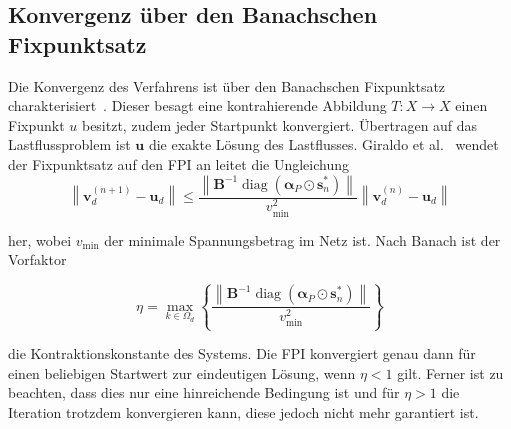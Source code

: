 \subsection{Konvergenz über den Banachschen Fixpunktsatz}
\label{subsec:banach}


Die Konvergenz des Verfahrens ist über den Banachschen Fixpunktsatz charakterisiert~\cite{Banach.1922}. Dieser besagt eine kontrahierende Abbildung $T: X \to X$ einen Fixpunkt $u$ besitzt, zudem jeder Startpunkt konvergiert.
Übertragen auf das Lastflussproblem ist $\mathbf{u}$ die exakte Lösung des Lastflusses. Giraldo et al.~\cite{Giraldo2022} wendet der Fixpunktsatz auf den FPI an leitet die Ungleichung
\begin{equation}
	\label{eq:contraction_tpf}
	\left\|\mathbf{v}_d^{(n+1)} - \mathbf{u}_d\right\|
	\leq \frac{\left\|\mathbf{B}^{-1}\operatorname{diag}(\boldsymbol{\alpha}_P \odot \mathbf{s}_n^{*})\right\|}{v_{\min}^2}
	\left\|\mathbf{v}_d^{(n)} - \mathbf{u}_d\right\|
\end{equation}

her, wobei $v_{\min}$  der minimale Spannungsbetrag im Netz ist. Nach Banach ist der Vorfaktor 

\begin{equation}
	\label{eq:eta}
	\boxed{\;\eta = \max_{k \in \Omega_d}\left\{\frac{\left\|\mathbf{B}^{-1}\operatorname{diag}(\boldsymbol{\alpha}_P \odot \mathbf{s}_n^{*})\right\|}{v_{\min}^2}\right\}\;}
\end{equation}

die Kontraktionskonstante des Systems.
Die FPI konvergiert genau dann für einen beliebigen Startwert zur eindeutigen Lösung, wenn $\eta < 1$ gilt. 
Ferner ist zu beachten, dass dies nur eine hinreichende Bedingung ist und für  $\eta > 1$ die Iteration trotzdem konvergieren kann, diese jedoch nicht mehr garantiert ist.\\

